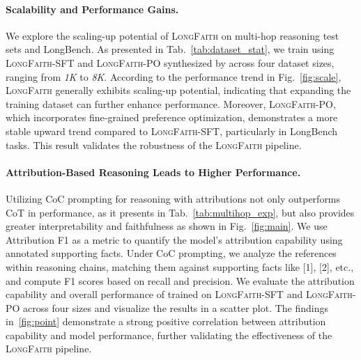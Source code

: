 \paragraph{Scalability and Performance Gains.} We explore the scaling-up potential of \textsc{LongFaith} on multi-hop reasoning test sets and LongBench. As presented in Tab.~\ref{tab:dataset_stat}, we train \textit{\llama} using \textsc{LongFaith}-SFT and \textsc{LongFaith}-PO synthesized by \textit{\qwen} across four dataset sizes, ranging from \textit{1K} to \textit{8K}. According to the performance trend in Fig.~\ref{fig:scale}, \textsc{LongFaith} generally exhibits scaling-up potential, indicating that expanding the training dataset can further enhance performance. Moreover, \textsc{LongFaith}-PO, which incorporates fine-grained preference optimization, demonstrates a more stable upward trend compared to \textsc{LongFaith}-SFT, particularly in LongBench tasks. This result validates the robustness of the \textsc{LongFaith} pipeline.

\paragraph{Attribution-Based Reasoning Leads to Higher Performance.} Utilizing CoC prompting for reasoning with attributions not only outperforms CoT in performance, as it presents in Tab.~\ref{tab:multihop_exp}, but also provides greater interpretability and faithfulness as shown in Fig.~\ref{fig:main}. We use Attribution F1 as a metric to quantify the model's attribution capability using annotated supporting facts. Under CoC prompting, we analyze the references within reasoning chains, matching them against supporting facts like [1], [2], etc., and compute F1 scores based on recall and precision. We evaluate the attribution capability and overall performance of \llama trained on \textsc{LongFaith}-SFT and \textsc{LongFaith}-PO across four sizes and visualize the results in a scatter plot. The findings in~\ref{fig:point} demonstrate a strong positive correlation between attribution capability and model performance, further validating the effectiveness of the \textsc{LongFaith} pipeline.

